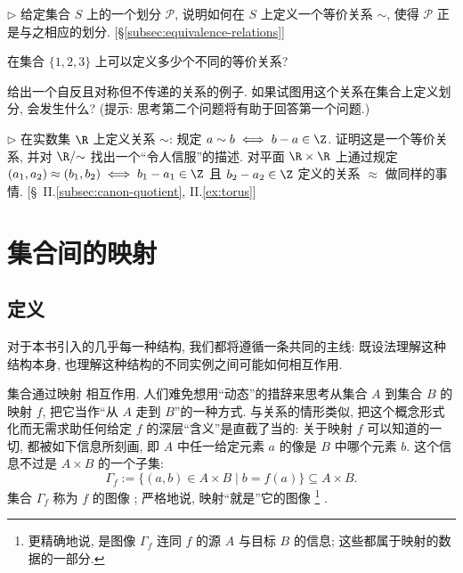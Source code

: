 \begin{prob}
\label{ex:relation-from-partition}
$\triangleright$ 给定集合 $S$ 上的一个划分 $\mathscr{P}$, 说明如何在 $S$ 上定义一个等价关系 $\sim$, 使得 $\mathscr{P}$ 正是与之相应的划分. [\S\ref{subsec:equivalence-relations}]
\end{prob}

\begin{prob}
\label{ex:equiv-rel-123}
在集合 $\{1,2,3\}$ 上可以定义多少个不同的等价关系?
\end{prob}

\begin{prob}
\label{ex:refl-symm-not-trans}
给出一个自反且对称但不传递的关系的例子. 如果试图用这个关系在集合上定义划分, 会发生什么? (提示: 思考第二个问题将有助于回答第一个问题.)
\end{prob}

\begin{prob}
\label{ex:quotient-R}
$\triangleright$ 在实数集 $\R$ 上定义关系 $\sim$: 规定 $a \sim b \iff b - a \in \Z$. 证明这是一个等价关系, 并对 $\R / {\sim}$ 找出一个``令人信服''的描述. 对平面 $\R \times \R$ 上通过规定 $(a_1, a_2) \approx (b_1, b_2) \iff b_1 - a_1 \in \Z$ 且 $b_2 - a_2 \in \Z$ 定义的关系 $\approx$ 做同样的事情. [\S~II.\ref{subsec:canon-quotient}, II.\ref{ex:torus}]
\end{prob}

\section{集合间的映射}
\label{sec:functions}

\subsection{定义}
\label{subsec:functions-def}

对于本书引入的几乎每一种结构, 我们都将遵循一条共同的主线: 既设法理解这种结构本身, 也理解这种结构的不同实例之间可能如何相互作用.

集合通过映射%
相互作用. 人们难免想用``动态''的措辞来思考从集合 $A$ 到集合 $B$ 的映射 $f$, 把它当作``从 $A$ 走到 $B$''的一种方式. 与关系的情形类似, 把这个概念形式化而无需求助任何给定 $f$ 的深层``含义''是直截了当的: 关于映射 $f$ 可以知道的一切, 都被如下信息所刻画, 即 $A$ 中任一给定元素 $a$ 的像是 $B$ 中哪个元素 $b$. 这个信息不过是 $A \times B$ 的一个子集:
\[
\Gamma_f := \{(a,b) \in A \times B \mid b = f(a)\} \subseteq A \times B.
\]
集合 $\Gamma_f$ 称为 $f$ 的图像%
; 严格地说, 映射``就是''它的图像%
\footnote{更精确地说, 是图像 $\Gamma_f$ 连同 $f$ 的源 $A$ 与目标 $B$ 的信息; 这些都属于映射的数据的一部分.}%
.

